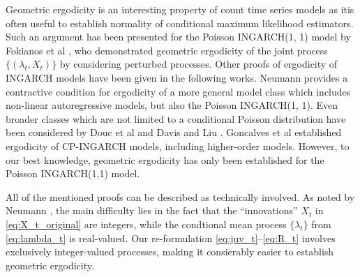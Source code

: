 \documentclass[10pt,a4paper]{article}
\begin{document}
Geometric ergodicity is an interesting property of count time series models as itis often useful to establish normality of conditional maximum likelihood estimators. Such an argument has been presented for the Poisson INGARCH(1, 1) model by Fokianos et al \cite{Fokianos2009}, who demonstrated geometric ergodicity of the joint process $\{(\lambda_t, X_t)\}$ by considering perturbed processes. Other proofs of ergodicity of INGARCH models have been given in the following works. Neumann \citep{Neumann2011} provides a contractive condition for ergodicity of a more general model class which includes non-linear autoregressive models, but also the Poisson INGARCH(1, 1). Even broader classes which are not limited to a conditional Poisson distribution have been considered by Douc et al \citep{Douc2013} and Davis and Liu \cite{Davis2016}. Goncalves et al \cite{Goncalves2015} established ergodicity of CP-INGARCH models, including higher-order models. However, to our best knowledge, geometric ergodicity has only been established for the Poisson INGARCH(1,1) model.

All of the mentioned proofs can be described as technically involved. As noted by Neumann \cite{Neumann2011}, the main difficulty lies in the fact that the ``innovations'' $X_t$ in \eqref{eq:X_t_original} are integers, while the condtional mean process $\{\lambda_t\}$ from \eqref{eq:lambda_t} is real-valued. Our re-formulation \eqref{eq:juv_t}--\eqref{eq:R_t} involves exclusively integer-valued processes, making it consierably easier to establish geometric ergodicity.
\end{document}
